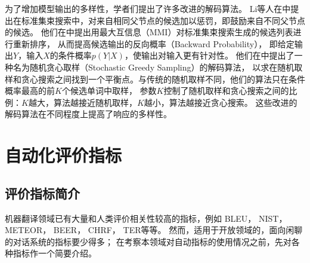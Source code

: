 为了增加模型输出的多样性，学者们提出了许多改进的解码算法。
Li等人在\cite{DiverseBeam}中提出在标准集束搜索中，对来自相同父节点的候选加以惩罚，即鼓励来自不同父节点的候选。
他们在\cite{MMI}中提出用最大互信息（MMI）对标准集束搜索生成的候选列表进行重新排序，
从而提高候选输出的反向概率（Backward Probability），
即给定输出$Y$，输入$X$的条件概率$p(Y|X)$，使输出对输入更有针对性。
他们在\cite{Distill}中提出了一种名为随机贪心取样（Stochastic Greedy Sampling）的解码算法，
以求在随机取样和贪心搜索之间找到一个平衡点。与传统的随机取样不同，他们的算法只在条件概率最高的前$K$个候选单词中取样，
参数$K$控制了随机取样和贪心搜索之间的比例：$K$越大，算法越接近随机取样，$K$越小，算法越接近贪心搜索。
这些改进的解码算法在不同程度上提高了响应的多样性。

\section{自动化评价指标}\label{sec:automatic_metric}
\subsection{评价指标简介}\label{subsec:metrics_intro}
机器翻译领域已有大量和人类评价相关性较高的指标，例如
BLEU，
NIST，
METEOR，
BEER，
CHRF，
TER等等。
然而，适用于开放领域的，面向闲聊的对话系统的指标要少得多；
在考察本领域对自动指标的使用情况之前，先对各种指标作一个简要介绍。

